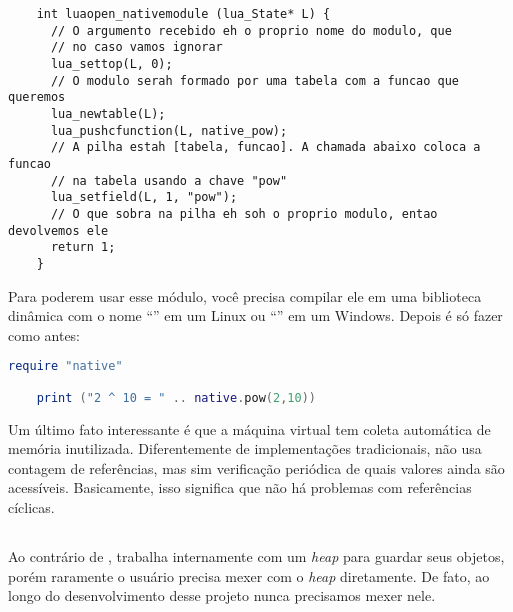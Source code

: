     \begin{lstlisting}
    int luaopen_nativemodule (lua_State* L) {
      // O argumento recebido eh o proprio nome do modulo, que
      // no caso vamos ignorar
      lua_settop(L, 0);
      // O modulo serah formado por uma tabela com a funcao que queremos
      lua_newtable(L);
      lua_pushcfunction(L, native_pow);
      // A pilha estah [tabela, funcao]. A chamada abaixo coloca a funcao
      // na tabela usando a chave "pow"
      lua_setfield(L, 1, "pow");
      // O que sobra na pilha eh soh o proprio modulo, entao devolvemos ele
      return 1;
    }
    \end{lstlisting}

      \vspace{1em}

      Para  poderem usar esse módulo, você precisa compilar ele em uma
      biblioteca dinâmica\footnotemark{} com o nome ``'' em um
      Linux ou ``'' em um Windows. Depois é só fazer como
      antes:


      \vspace{1em}

    \begin{lstlisting}[language=lua]
    require "native"

    print ("2 ^ 10 = " .. native.pow(2,10))
    \end{lstlisting}

      \vspace{1em}

      Um último fato interessante é que a máquina virtual tem coleta automática
      de memória inutilizada. Diferentemente de implementações tradicionais,
       não usa contagem de referências, mas sim verificação periódica
      de quais valores ainda são acessíveis. Basicamente, isso significa que não
      há problemas com referências cíclicas.

    \subsection{}
    \label{cap:conceitos:apis:python}
    Ao contrário de ,  trabalha internamente com um
    \emph{heap} para guardar seus objetos, porém raramente o usuário precisa
    mexer com o \textit{heap} diretamente. De fato, ao longo do desenvolvimento 
    desse projeto nunca precisamos mexer nele.

